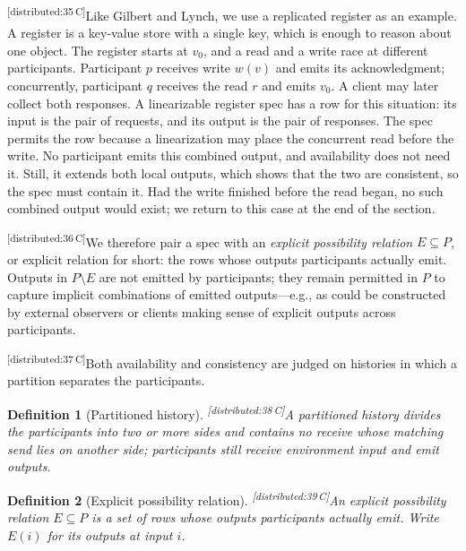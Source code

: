 \documentclass[sigconf]{cidr-2027}
\newtheorem{definition}{Definition}
\theoremstyle{remark}
\newcommand{\outrel}{extends\xspace}          %
\newcommand{\cxtag}[2]{\textsuperscript{\textsf{\tiny[#1\,#2]}}}
\begin{document}
\color{black!45}\cxtag{distributed:35}{C}Like Gilbert and Lynch, we use a replicated register as an example.
A register is a key-value store with a single key, which is enough to reason
about one object.  The register starts at $v_0$, and a read and a write race at
different participants.  Participant $p$ receives write $w(v)$ and emits its
acknowledgment; concurrently, participant $q$ receives the read $r$ and emits
$v_0$.  A client may later collect both responses.  A linearizable register
spec has a row for this situation: its input is the pair of requests, and its
output is the pair of responses.  The spec permits the row because a
linearization may place the concurrent read before the write.  No participant
emits this combined output, and availability does not need it.  Still, it
\outrel both local outputs, which shows that the two are consistent, so the
spec must contain it.  Had the write finished before the read began, no such
combined output would exist; we return to this case at the end of the section.\color{black}

\color{black!45}\cxtag{distributed:36}{C}We therefore pair a spec with an \emph{explicit possibility relation}
$E\subseteq P$, or explicit relation for short: the rows whose outputs
participants actually emit.  Outputs in
$P\setminus E$ are not emitted by participants;
they remain permitted in $P$ to capture implicit combinations of emitted outputs---e.g.,
as could be constructed by external observers or clients making sense of explicit outputs
across participants.\color{black}

\color{black!45}\cxtag{distributed:37}{C}Both availability and consistency are judged on histories in which a partition
separates the participants.\color{black}

\color{black!45}\begin{definition}[Partitioned history]
\label{def:partitioned-history}
\cxtag{distributed:38}{C}A \emph{partitioned history} divides the participants into two or more
sides and contains no receive whose matching send lies on another
side; participants still receive environment input and emit outputs.\color{black}
\end{definition}

\color{black!45}\begin{definition}[Explicit possibility relation]
\label{def:explicit-relation}
\cxtag{distributed:39}{C}An \emph{explicit possibility relation} $E\subseteq P$ is a set of rows whose
outputs participants actually emit.  Write $E(i)$ for its outputs at input
$i$.\color{black}
\end{definition}
\end{document}
